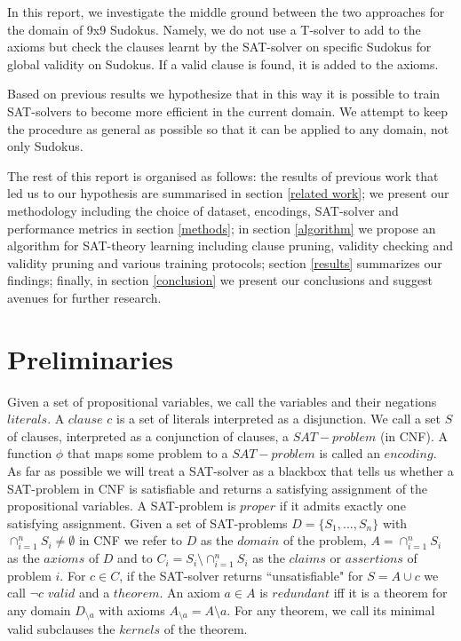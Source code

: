\documentclass{article}
\begin{document}
In this report, we investigate the middle ground between the two approaches for the domain of 9x9 Sudokus. Namely, we do not use a T-solver to add to the axioms but check the clauses learnt by the SAT-solver on specific Sudokus for global validity on Sudokus. If a valid clause is found, it is added to the axioms.

Based on previous results we hypothesize that in this way it is possible to train SAT-solvers to become more efficient in the current domain. We attempt to keep the procedure as general as possible so that it can be applied to any domain, not only Sudokus.

The rest of this report is organised as follows: the results of previous work that led us to our hypothesis are summarised in section \ref{related work}; we present our methodology including the choice of dataset, encodings, SAT-solver and performance metrics in section \ref{methods}; in section \ref{algorithm} we propose an algorithm for SAT-theory learning including clause pruning, validity checking and validity pruning and various training protocols; section \ref{results} summarizes our findings; finally, in section \ref{conclusion} we present our conclusions and suggest avenues for further research.

\section{Preliminaries}

Given a set of propositional variables, we call the variables and their negations $literals$. A $clause$ $c$ is a set of literals interpreted as a disjunction. We call a set $S$ of clauses, interpreted as a conjunction of clauses, a $SAT-problem$ (in CNF). A function $\phi$ that maps some problem to a $SAT-problem$ is called an $encoding$. As far as possible we will treat a SAT-solver as a blackbox that tells us whether a SAT-problem in CNF is satisfiable and returns a satisfying assignment of the propositional variables. A SAT-problem is $proper$ if it admits exactly one satisfying assignment. Given a set of SAT-problems $D=\{S_1,...,S_n\}$ with $\cap_{i=1}^n S_i\neq \emptyset$ in CNF we refer to $D$ as the $domain$ of the problem, $A=\cap_{i=1}^n S_i$ as the $axioms$ of $D$ and to $C_i=S_i\setminus \cap_{i=1}^n S_i$ as the $claims$ or $assertions$ of problem $i$.
For $c\in C$, if the SAT-solver returns ``unsatisfiable" for $S=A\cup c$ we call $\neg c$ $valid$ and a $theorem$. An axiom $a\in A$ is $redundant$ iff it is a theorem for any domain $D_{\setminus a}$ with axioms $A_{\setminus a}=A\setminus a$. For any theorem, we call its minimal valid subclauses the $kernels$ of the theorem.
\end{document}
